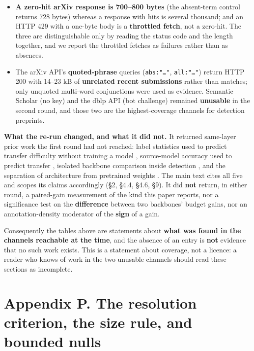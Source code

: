 \documentclass[pdflatex,sn-mathphys-ay]{sn-jnl}
\begin{document}
\begin{itemize}
\item \textbf{A zero-hit arXiv response is 700--800 bytes} (the absent-term control returns 728 bytes) whereas a response with hits is several thousand; and an HTTP 429 with a one-byte body is a \textbf{throttled fetch}, not a zero-hit. The three are distinguishable only by reading the status code and the length together, and we report the throttled fetches as failures rather than as absences.
\item The arXiv API's \textbf{quoted-phrase} queries (\texttt{abs:"\ldots{}"}, \texttt{all:"\ldots{}"}) return HTTP 200 with 14--23 kB of \textbf{unrelated recent submissions} rather than matches; only unquoted multi-word conjunctions were used as evidence. Semantic Scholar (no key) and the dblp API (bot challenge) remained \textbf{unusable} in the second round, and those two are the highest-coverage channels for detection preprints.
\end{itemize}

\textbf{What the re-run changed, and what it did not.} It returned same-layer prior work the first round had not reached: label statistics used to predict transfer difficulty without training a model \citep{andriushchenko2023}, source-model accuracy used to predict transfer \citep{dziugaite2020}, isolated backbone comparison inside detection \citep{dinh2017,kwon2021}, and the separation of architecture from pretrained weights \citep{hu2023}. The main text cites all five and scopes its claims accordingly (\S{}2, \S{}4.4, \S{}4.6, \S{}9). It did \textbf{not} return, in either round, a paired-gain measurement of the kind this paper reports, nor a significance test on the \textbf{difference} between two backbones' budget gains, nor an annotation-density moderator of the \textbf{sign} of a gain.

Consequently the tables above are statements about \textbf{what was found in the channels reachable at the time}, and the absence of an entry is \textbf{not} evidence that no such work exists. This is a statement about coverage, not a licence: a reader who knows of work in the two unusable channels should read these sections as incomplete.

\section*{Appendix P. The resolution criterion, the size rule, and bounded nulls}
\end{document}
